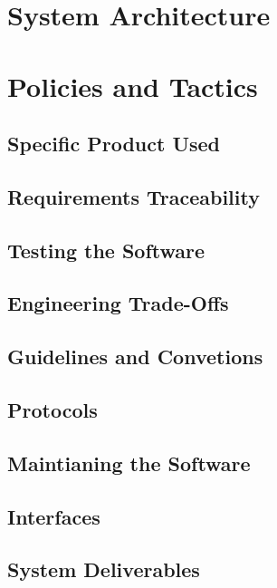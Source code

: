 \documentclass[11pt]{article}
\begin{document}
\section{System Architecture}
\label{sec:architecture}

\section{Policies and Tactics}
\label{sec:policies}

\subsection{Specific Product Used}
\label{sec:specific}

\subsection{Requirements Traceability}
\label{sec:traceability}

\subsection{Testing the Software}
\label{sec:testing}

\subsection{Engineering Trade-Offs}
\label{sec:tradeoffs}

\subsection{Guidelines and Convetions}
\label{sec:guidelines}

\subsection{Protocols}
\label{sec:protocols}

\subsection{Maintianing the Software}
\label{sec:maintain}

\subsection{Interfaces}
\label{sec:interfaces}

\subsection{System Deliverables}
\label{sec:deliverables}
\end{document}
